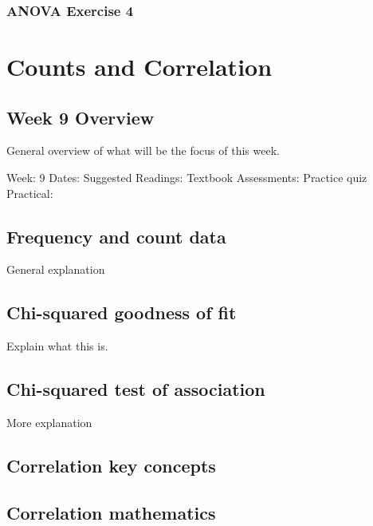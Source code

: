 \documentclass[
]{scrbook}
\begin{document}
\hypertarget{anova-exercise-4}{%
\section{ANOVA Exercise 4}\label{anova-exercise-4}}

\hypertarget{part-counts-and-correlation}{%
\part{Counts and Correlation}\label{part-counts-and-correlation}}

\hypertarget{Week9}{%
\chapter*{Week 9 Overview}\label{Week9}}

General overview of what will be the focus of this week.

Week: 9
Dates:
Suggested Readings: Textbook
Assessments: Practice quiz
Practical:

\hypertarget{frequency-and-count-data}{%
\chapter{Frequency and count data}\label{frequency-and-count-data}}

General explanation

\hypertarget{chi-squared-goodness-of-fit}{%
\chapter{Chi-squared goodness of fit}\label{chi-squared-goodness-of-fit}}

Explain what this is.

\hypertarget{chi-squared-test-of-association}{%
\chapter{Chi-squared test of association}\label{chi-squared-test-of-association}}

More explanation

\hypertarget{correlation-key-concepts}{%
\chapter{Correlation key concepts}\label{correlation-key-concepts}}

\hypertarget{correlation-mathematics}{%
\chapter{Correlation mathematics}\label{correlation-mathematics}}
\end{document}
